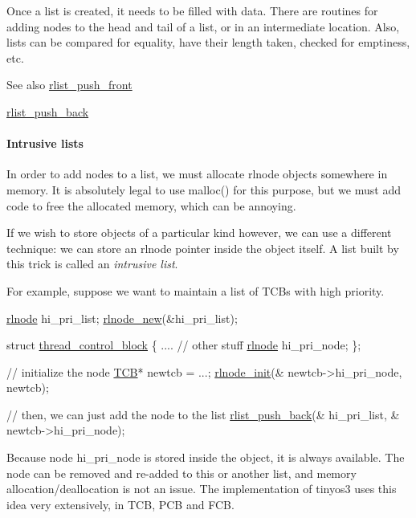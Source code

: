 Once a list is created, it needs to be filled with data. There are routines for adding nodes to the head and tail of a list, or in an intermediate location. Also, lists can be compared for equality, have their length taken, checked for emptiness, etc. \begin{DoxySeeAlso}{See also}
\hyperlink{group__rlists_ga63ab59e50f2007a6bfedb0180a73b06f}{rlist\+\_\+push\+\_\+front} 

\hyperlink{group__rlists_gac454004e8fb74ccd539e7fbd1affa86a}{rlist\+\_\+push\+\_\+back}
\end{DoxySeeAlso}
\paragraph*{Intrusive lists}

In order to add nodes to a list, we must allocate {\ttfamily rlnode} objects somewhere in memory. It is absolutely legal to use {\ttfamily malloc()} for this purpose, but we must add code to free the allocated memory, which can be annoying.

If we wish to store objects of a particular kind however, we can use a different technique\+: we can store an rlnode pointer inside the object itself. A list built by this trick is called an {\itshape intrusive list}.

For example, suppose we want to maintain a list of T\+C\+Bs with high priority. 
\begin{DoxyCode}
\hyperlink{structresource__list__node}{rlnode} hi\_pri\_list;  \hyperlink{group__rlists_gaccdb4bce65952fede472de20297eb36e}{rlnode\_new}(&hi\_pri\_list);

\textcolor{keyword}{struct }\hyperlink{structthread__control__block}{thread\_control\_block} \{
 .... \textcolor{comment}{// other stuff}
 \hyperlink{structresource__list__node}{rlnode} hi\_pri\_node;
\};

\textcolor{comment}{// initialize the node}
\hyperlink{structthread__control__block}{TCB}* newtcb = ...;
\hyperlink{group__rlists_ga578e6dc256d4f1580bd8500edf374aca}{rlnode\_init}(& newtcb->hi\_pri\_node, newtcb);

\textcolor{comment}{// then, we can just add the node to the list}
\hyperlink{group__rlists_gac454004e8fb74ccd539e7fbd1affa86a}{rlist\_push\_back}(& hi\_pri\_list, & newtcb->hi\_pri\_node);
\end{DoxyCode}


Because node {\ttfamily hi\+\_\+pri\+\_\+node} is stored inside the object, it is always available. The node can be removed and re-\/added to this or another list, and memory allocation/deallocation is not an issue. The implementation of tinyos3 uses this idea very extensively, in T\+CB, P\+CB and F\+CB. 

